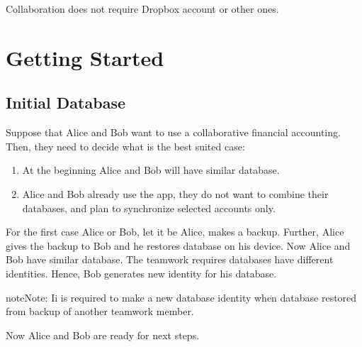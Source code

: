 \documentclass[a4paper,10pt,english]{sphinxmanual}
\begin{document}
Collaboration does not require Dropbox account or other ones.


\section{Getting Started}
\label{\detokenize{teamwork:getting-started}}

\subsection{Initial Database}
\label{\detokenize{teamwork:initial-database}}
Suppose that Alice and Bob want to use a collaborative financial accounting.
Then, they need to decide what is the best suited case:
\begin{enumerate}
\def\theenumi{\arabic{enumi}}
\def\labelenumi{\theenumi .}
\makeatletter\def\p@enumii{\p@enumi \theenumi .}\makeatother
\item {} 
At the beginning Alice and Bob will have similar database.

\item {} 
Alice and Bob already use the app, they do not want to combine their databases, and plan to synchronize selected accounts only.

\end{enumerate}

For the first case Alice or Bob, let it be Alice, makes a backup. Further, Alice gives the
backup to Bob and he restores database on his device. Now Alice and Bob have similar database.
The teamwork requires databases have different identities. Hence, Bob generates new identity
for his database.

\begin{sphinxadmonition}{note}{Note:}
Ii is required to make a new database identity when database restored from backup of another teamwork member.
\end{sphinxadmonition}

\noindent{}
\noindent{}
\noindent{}
\noindent{}
\noindent{}

Now Alice and Bob are ready for next steps.
\end{document}
